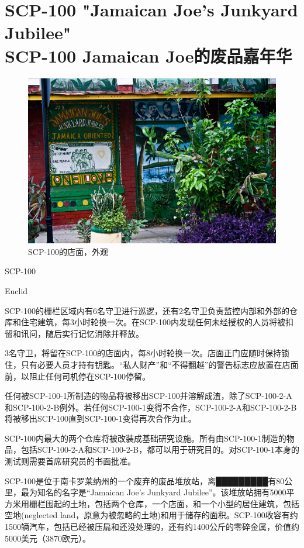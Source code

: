 \chapter[SCP-100 Jamaican Joe的废品嘉年华]{
    SCP-100 "Jamaican Joe's Junkyard Jubilee"\\
    SCP-100 Jamaican Joe的废品嘉年华
}

\label{chap:SCP-100}

\begin{figure}[H]
    \centering
    \includegraphics[width=0.5\linewidth]{images/SCP-100.png}
    \caption*{SCP-100的店面，外观}
\end{figure}

SCP-100

Euclid

SCP-100的栅栏区域内有6名守卫进行巡逻，还有2名守卫负责监控内部和外部的仓库和住宅建筑，每3小时轮换一次。在SCP-100内发现任何未经授权的人员将被扣留和讯问，随后实行记忆消除并释放。

3名守卫，将留在SCP-100的店面内，每8小时轮换一次。店面正门应随时保持锁住，只有必要人员才持有钥匙。“私人财产”和“不得翻越”的警告标志应放置在店面前，以阻止任何司机停在SCP-100停留。

任何被SCP-100-1所制造的物品将被移出SCP-100并溶解成渣，除了SCP-100-2-A和SCP-100-2-B例外。若任何SCP-100-1变得不合作，SCP-100-2-A和SCP-100-2-B将被移出SCP-100直到SCP-100-1变得再次合作为止。

SCP-100内最大的两个仓库将被改装成基础研究设施。所有由SCP-100-1制造的物品，包括SCP-100-2-A和SCP-100-2-B，都可以用于研究目的。对SCP-100-1本身的测试则需要首席研究员的书面批准。

SCP-100是位于南卡罗莱纳州的一个废弃的废品堆放站，离█████████有80公里，最为知名的名字是“Jamaican Joe's Junkyard Jubilee”。该堆放站拥有5000平方米用栅栏围起的土地，包括两个仓库，一个店面，和一个小型的居住建筑，包括空地(neglected land，原意为被忽略的土地)和用于储存的面积。SCP-100收容有约1500辆汽车，包括已经被压扁和还没处理的，还有约1400公斤的零碎金属，价值约5000美元（3870欧元）。

